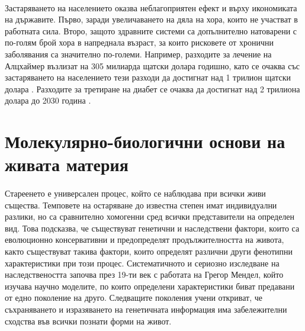 \documentclass[pdftex,cyrillic,14pt,a4page,twoside,openright]{extreport}
\begin{document}
\paragraph{}
Застаряването на населението оказва неблагоприятен ефект и върху икономиката на държавите. Първо, заради увеличаването на дяла на хора, които не участват в работната сила. Второ, защото здравните системи са допълнително натоварени с по-голям брой хора в напреднала възраст, за които рисковете от хронични заболявания са значително по-големи. Например, разходите за лечение на Алцхаймер възлизат на 305 милиарда щатски долара годишно, като се очаква със застаряването на населението тези разходи да достигнат над 1 трилион щатски долара \cite{wong2020}. Разходите за третиране на диабет се очаква да достигнат над 2 трилиона долара до 2030 година \cite{bommer2018}.

\section[Молекулярно-биологични основи на живата материя]{Молекулярно-биологични основи на\\ живата материя}\label{sec:basic_genetics}

\paragraph{}
Стареенето е универсален процес, който се наблюдава при всички живи същества. Темповете на остаряване до известна степен имат индивидуални разлики, но са сравнително хомогенни сред всички представители на определен вид. Това подсказва, че съществуват генетични и наследствени фактори, които са еволюционно консервативни и предопределят продължителността на живота, както съществуват такива фактори, които определят различни други фенотипни характеристики при този процес. Систематичното и сериозно изследване на наследствеността започва през 19-ти век с работата на Грегор Мендел, който изучава научно моделите, по които определени характеристики биват предавани от едно поколение на друго. Следващите поколения учени откриват, че съхраняването и изразяването на генетичната информация има забележителни сходства във всички познати форми на живот.
\end{document}
